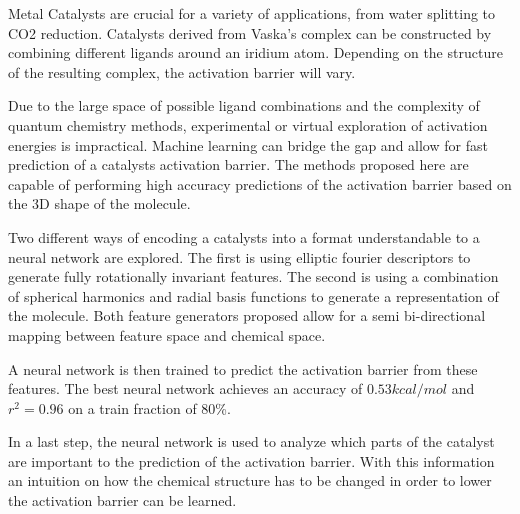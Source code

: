 
\Abstract

Metal Catalysts are crucial for a variety of applications, from water splitting to CO2 reduction. %
Catalysts derived from Vaska's complex can be constructed by combining different ligands around an iridium atom.
Depending on the structure of the resulting complex, the activation barrier will vary.


Due to the large space of possible ligand combinations and the complexity of quantum chemistry methods, experimental or virtual exploration
of activation energies is impractical.
Machine learning can bridge the gap and allow for fast prediction of a catalysts activation barrier.
The methods proposed here are capable of performing high accuracy predictions of the activation barrier based on
the 3D shape of the molecule.

Two different ways of encoding a catalysts into a format understandable to a neural network are explored.
The first is using elliptic fourier descriptors to generate fully rotationally invariant features.
The second is using a combination of spherical harmonics and radial basis functions to generate a representation of the 
molecule.
Both feature generators proposed allow for a semi bi-directional mapping between feature space and chemical space.

A neural network is then trained to predict the activation barrier from these features.
The best neural network achieves an accuracy of $0.53 kcal/mol$ and $r^2 = 0.96$ on a train fraction of 80\%.

In a last step, the neural network is used to analyze which parts of the catalyst are important to the prediction of the activation barrier.
With this information an intuition on how the chemical structure has to be changed in order to lower the activation barrier can be learned.
